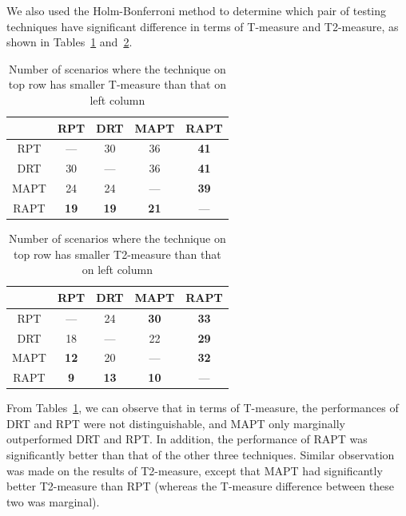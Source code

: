 \documentclass[10pt,journal,compsoc]{IEEEtran}
\begin{document}
We also used the Holm-Bonferroni method to determine which pair of testing techniques have significant difference in terms of T-measure and T2-measure, as shown in Tables~\ref{tab:Tsta} and~\ref{tab:T2sta}.

\begin{table}
\caption{Number of scenarios where the technique on top row has smaller T-measure than that on left column}
\label{tab:Tsta}
\centering
\begin{tabular}{|c|c|c|c|c|} \hline
			& RPT					& DRT					& MAPT				& RAPT				\\ \hline
RPT		& ---					& 30					& 36					& \textbf{41}	\\ \hline
DRT		& 30					& ---					& 36					& \textbf{41}	\\ \hline
MAPT	& 24					& 24					& ---					& \textbf{39}	\\ \hline
RAPT	& \textbf{19}	& \textbf{19}	& \textbf{21}	& ---					\\ \hline
\end{tabular}
\end{table}

\begin{table}
\caption{Number of scenarios where the technique on top row has smaller T2-measure than that on left column}
\label{tab:T2sta}
\centering
\begin{tabular}{|c|c|c|c|c|} \hline
			& RPT					& DRT					& MAPT				& RAPT				\\ \hline
RPT		& ---					& 24					& \textbf{30}	& \textbf{33}	\\ \hline
DRT		& 18					& ---					& 22					& \textbf{29}	\\ \hline
MAPT	& \textbf{12}	& 20					& ---					& \textbf{32}	\\ \hline
RAPT	& \textbf{9}	& \textbf{13}	& \textbf{10}	& ---					\\ \hline
\end{tabular}
\end{table}

From Tables~\ref{tab:Tsta}, we can observe that in terms of T-measure, the performances of DRT and RPT were not distinguishable, and MAPT only marginally outperformed DRT and RPT. In addition, the performance of RAPT was significantly better than that of the other three techniques. Similar observation was made on the results of T2-measure, except that MAPT had significantly better T2-measure than RPT (whereas the T-measure difference between these two was marginal).
\end{document}
